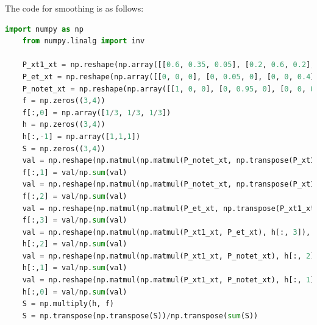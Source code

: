 \documentclass[letter, 9pt]{article}
\begin{document}
The code for smoothing is as follows:
\begin{lstlisting}[language=Python]
    import numpy as np
    from numpy.linalg import inv

    P_xt1_xt = np.reshape(np.array([[0.6, 0.35, 0.05], [0.2, 0.6, 0.2], [0, 0.5, 0.5]]), (3, 3))
    P_et_xt = np.reshape(np.array([[0, 0, 0], [0, 0.05, 0], [0, 0, 0.4]]), (3, 3))
    P_notet_xt = np.reshape(np.array([[1, 0, 0], [0, 0.95, 0], [0, 0, 0.6]]), (3, 3))
    f = np.zeros((3,4))
    f[:,0] = np.array([1/3, 1/3, 1/3])
    h = np.zeros((3,4))
    h[:,-1] = np.array([1,1,1])
    S = np.zeros((3,4))
    val = np.reshape(np.matmul(np.matmul(P_notet_xt, np.transpose(P_xt1_xt)), f[:, 0]), (3))
    f[:,1] = val/np.sum(val)
    val = np.reshape(np.matmul(np.matmul(P_notet_xt, np.transpose(P_xt1_xt)), f[:,1]), (3))
    f[:,2] = val/np.sum(val)
    val = np.reshape(np.matmul(np.matmul(P_et_xt, np.transpose(P_xt1_xt)), f[:,2]), (3))
    f[:,3] = val/np.sum(val)
    val = np.reshape(np.matmul(np.matmul(P_xt1_xt, P_et_xt), h[:, 3]), (3))
    h[:,2] = val/np.sum(val)
    val = np.reshape(np.matmul(np.matmul(P_xt1_xt, P_notet_xt), h[:, 2]), (3))
    h[:,1] = val/np.sum(val)
    val = np.reshape(np.matmul(np.matmul(P_xt1_xt, P_notet_xt), h[:, 1]), (3))
    h[:,0] = val/np.sum(val)
    S = np.multiply(h, f)
    S = np.transpose(np.transpose(S))/np.transpose(sum(S))
\end{lstlisting}

\newpage
\end{document}
